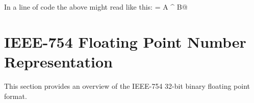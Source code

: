 In a line of code the above might read like this: \verb@output = A ^ B@



%



\section{IEEE-754 Floating Point Number Representation}
\label{chapter::floatingpoint}

This section provides an overview of the IEEE-754 32-bit binary floating 
point format.

